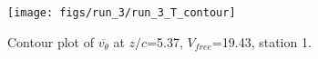 \begin{figure}[H]
\centering
\texttt{[image: figs/run\_3/run\_3\_T\_contour]}
\caption{Contour plot of $\overline{v_{\theta}}$ at $z/c$=5.37, $V_{free}$=19.43, station 1.}
\label{fig:run_3_T_contour}
\end{figure}


